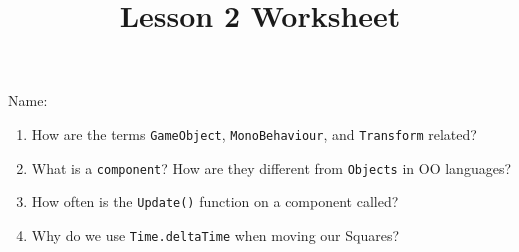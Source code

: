 \documentclass[12pt]{../rhitcsse}
\title{Lesson 2 Worksheet}
\begin{document}
\maketitle

\vspace*{0.15in}\hspace{0.25in}Name:\hrulefill\hspace{0.25in}\hspace{0.25in}

\begin{enumerate}
  \item How are the terms \texttt{GameObject}, \texttt{MonoBehaviour}, and \texttt{Transform} related? 
  \vfill

  \item What is a \texttt{component}? How are they different from \texttt{Objects} in OO languages?
  \vfill

  \item How often is the \texttt{Update()} function on a component called? 
  \vfill
  
  \item Why do we use \texttt{Time.deltaTime} when moving our Squares?
  \vfill
  \clearpage


\end{enumerate}
\end{document}
